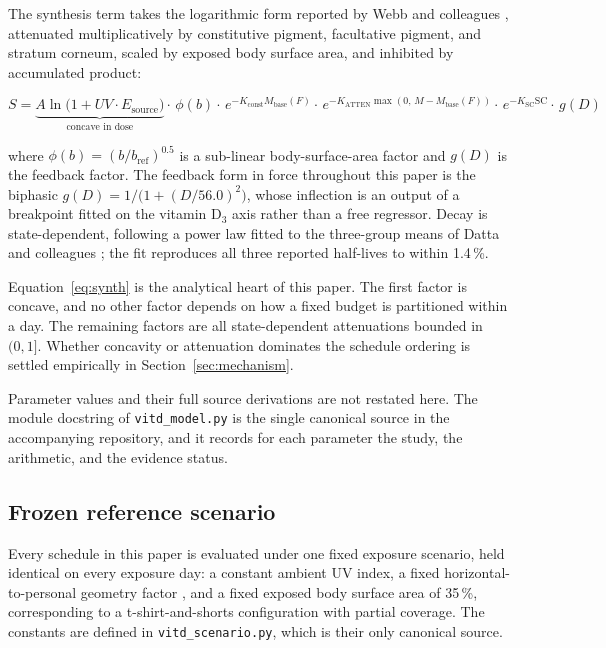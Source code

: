 \documentclass[11pt]{article}
\begin{document}
The synthesis term takes the logarithmic form reported by Webb and
colleagues \citep{webb2021}, attenuated multiplicatively by
constitutive pigment, facultative pigment, and stratum corneum, scaled
by exposed body surface area, and inhibited by accumulated product:

\begin{equation}
\label{eq:synth}
S = \underbrace{A \ln\!\big(1 + UV \cdot E_{\mathrm{source}}\big)}_{\text{concave in dose}}
\cdot\, \phi(b)
\cdot\, e^{-K_{\mathrm{const}} M_{\mathrm{base}}(F)}
\cdot\, e^{-K_{\mathrm{ATTEN}} \max(0,\, M - M_{\mathrm{base}}(F))}
\cdot\, e^{-K_{\mathrm{SC}} \mathrm{SC}}
\cdot\, g(D)
\end{equation}

where $\phi(b) = (b/b_{\mathrm{ref}})^{0.5}$ is a sub-linear
body-surface-area factor and $g(D)$ is the feedback factor. The
feedback form in force throughout this paper is the biphasic
$g(D) = 1/\big(1 + (D/56.0)^2\big)$, whose inflection is an output of
a breakpoint fitted on the vitamin D$_3$ axis \citep{scholze2026}
rather than a free regressor. Decay is state-dependent, following a
power law fitted to the three-group means of Datta and colleagues
\citep{datta2017}; the fit reproduces all three reported half-lives
to within 1.4\,\%.

Equation~\eqref{eq:synth} is the analytical heart of this paper. The
first factor is concave, and no other factor depends on how a fixed
budget is partitioned within a day. The remaining factors are all
state-dependent attenuations bounded in $(0,1]$. Whether concavity or
attenuation dominates the schedule ordering is settled empirically in
Section~\ref{sec:mechanism}.

Parameter values and their full source derivations are not restated
here. The module docstring of \texttt{vitd\_model.py} is the single
canonical source in the accompanying repository, and it records for
each parameter the study, the arithmetic, and the evidence status.

\subsection{Frozen reference scenario}

Every schedule in this paper is evaluated under one fixed exposure
scenario, held identical on every exposure day: a constant ambient UV
index, a fixed horizontal-to-personal geometry factor
\citep{cockell2001}, and a fixed exposed body surface area of 35\,\%,
corresponding to a t-shirt-and-shorts configuration with partial
coverage. The constants are defined in \texttt{vitd\_scenario.py},
which is their only canonical source.
\end{document}
